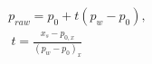 \documentclass[preview]{standalone}
\begin{document}
\begin{align*}
p_{raw} = p_0 + t (p_w - p_0),\\\ t = \frac{x_s - p_{0,x}}{(p_w - p_0)_x}
\end{align*}
\end{document}
